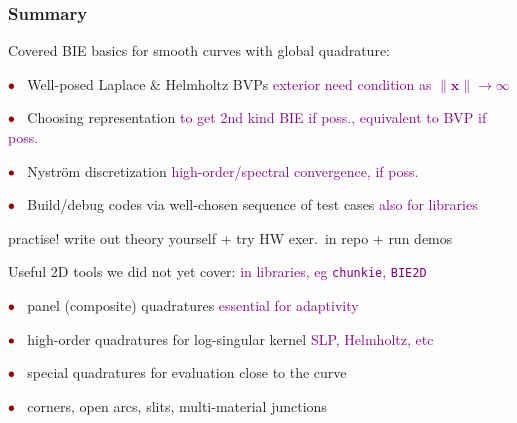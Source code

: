 \documentclass[t]{beamer}
\newcommand{\ft}[1]{\frametitle{#1}}
\newcommand{\mbf}[1]{{\bm #1}}           %
\newcommand{\com}[1]{{\scriptsize \textcolor{purple}{#1}}}      %
\newcommand{\vg}{\vspace{2ex}}
\newcommand{\sg}{\vspace{1ex}}
\newcommand{\dr}[1]{{\color{darkred}#1}}    %
\newcommand{\rb}{\ensuremath{\textcolor{darkred}{\bullet\;}}\ }
\newcommand{\xx}{\mbf{x}}
\begin{document}
\begin{frame}\ft{Summary}


  Covered BIE basics for smooth curves with global quadrature:

\sg
  
  \rb Well-posed Laplace \& Helmholtz BVPs\hfill
 \com{exterior need condition as $\|\xx\|\to\infty$}
  
  \rb Choosing representation \hfill \com{to get 2nd kind BIE if poss., equivalent to BVP if poss.}

  \qquad \com{Can switch interior/exterior, Laplace/Helmholtz/etc, via simple code changes}
  
  \rb Nystr\"om discretization \hfill \com{high-order/spectral convergence, if poss.}

  \rb Build/debug codes via well-chosen sequence of test cases
  \hfill\com{also for libraries}

  \sg
  
  \dr{\small practise! write out theory yourself + try HW exer.\ in repo + run demos}

  

\pause \vg

Useful 2D tools we did not yet cover:
\hfill\com{in libraries, eg {\tt chunkie}, {\tt BIE2D}}

\sg

\rb panel (composite) quadratures \hfill\com{essential for adaptivity}

\rb high-order quadratures for log-singular kernel \hfill\com{SLP, Helmholtz, etc}

\rb special quadratures for evaluation close to the curve

 \qquad\com{some need interpolation of $\sigma(t)$ off the nodes $t_j$, some not}

 \rb corners, open arcs, slits, multi-material junctions

  


  


  
\end{frame}
\end{document}
